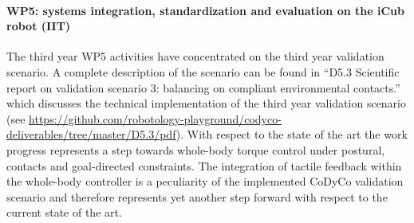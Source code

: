 
\paragraph*{WP5: systems integration, standardization and evaluation on the iCub robot (IIT)}

The third year WP5 activities have concentrated on the third year validation scenario. A complete
description of the scenario can be found in ``D5.3 Scientific report on validation scenario 3:
balancing on compliant environmental contacts.'' which discusses the technical
implementation of the third year validation scenario (see
\url{https://github.com/robotology-playground/codyco-deliverables/tree/master/D5.3/pdf}). With
respect to the state of the art the work progress represents a step towards whole-body torque
control under postural, contacts and goal-directed constraints. The integration of tactile
feedback within the whole-body controller is a peculiarity of the implemented CoDyCo validation
scenario and therefore represents yet another step forward with respect to the current state of
the art.
